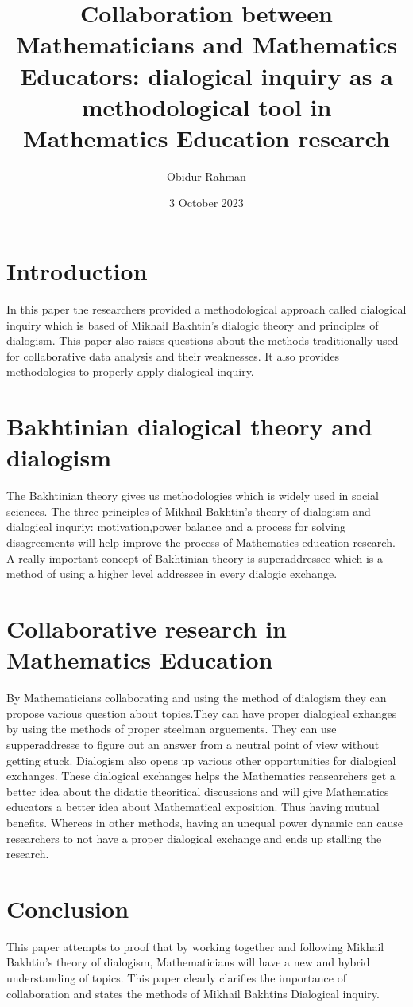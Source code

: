 \documentclass{article}
\title{Collaboration between Mathematicians and Mathematics 
Educators: dialogical inquiry as a methodological tool 
in Mathematics Education research}
\author{Obidur Rahman}
\date{3 October 2023}
\begin{document}
\maketitle

\section{Introduction}
In this paper the researchers provided a methodological approach called dialogical inquiry which is based of Mikhail Bakhtin's dialogic theory and principles of dialogism. This paper also raises questions about the methods traditionally used for collaborative data analysis and their weaknesses. It also provides methodologies to properly apply dialogical inquiry.

\section{Bakhtinian dialogical theory and dialogism}
The Bakhtinian theory gives us methodologies which is widely used in social sciences. The three principles of Mikhail Bakhtin’s theory of dialogism and dialogical inquriy: motivation,power balance and a process for solving disagreements will help improve the process of Mathematics education research. A really important concept of Bakhtinian theory is superaddressee which is a method of using a higher level addressee in every dialogic exchange. 

\section{Collaborative research in Mathematics Education}
By Mathematicians collaborating and using the method of dialogism they can propose various question about topics.They can have proper dialogical exhanges by using the methods of proper steelman arguements. They can use supperaddresse to figure out an answer from a neutral point of view without getting stuck. Dialogism also opens up various other opportunities for dialogical exchanges. These dialogical exchanges helps the Mathematics reasearchers get a better idea about the didatic theoritical discussions and will give Mathematics educators a better idea about Mathematical exposition. Thus having mutual benefits. Whereas in other methods, having an unequal power dynamic can cause researchers to not have a proper dialogical exchange and ends up stalling the research. 

\section{Conclusion}
This paper attempts to proof that by working together and following Mikhail Bakhtin’s theory of dialogism, Mathematicians will have a new and hybrid understanding of topics. This paper clearly clarifies the importance of collaboration and states the methods of Mikhail Bakhtins Dialogical inquiry.
\end{document}
